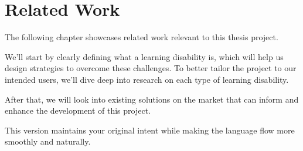 % 
%  
%
\chapter{Related Work}
\label{cha:related_work}

The following chapter showcases related work relevant to this thesis project.

We’ll start by clearly defining what a learning disability is, which will help us design strategies to overcome these challenges. To better tailor the project to our intended users, we’ll dive deep into research on each type of learning disability.

After that, we will look into existing solutions on the market that can inform and enhance the development of this project.

This version maintains your original intent while making the language flow more smoothly and naturally.


\newpage
















